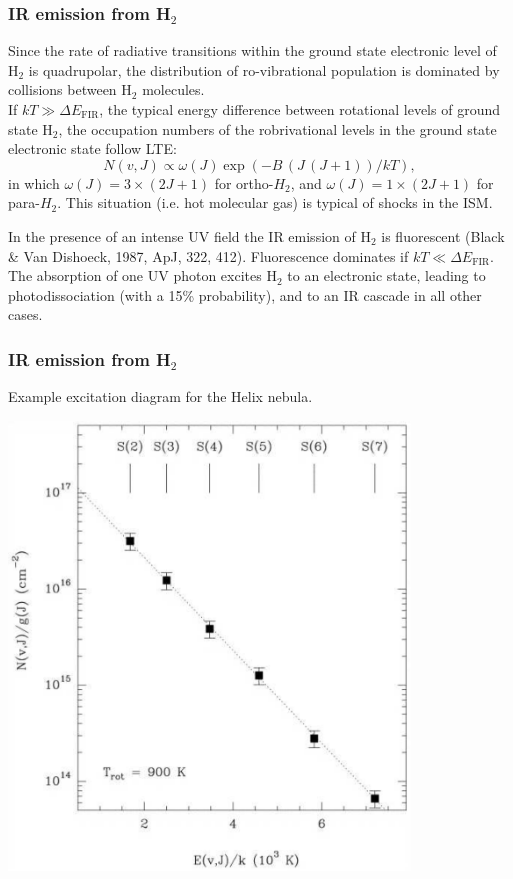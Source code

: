 \begin{frame}
\end{frame} \begin{frame}\frametitle{IR emission from  H$_2$}

Since the rate of radiative transitions within the ground state
electronic level of H$_2$ is quadrupolar, the distribution of
ro-vibrational population is dominated by collisions between H$_2$
molecules. \\

If $kT \gg \Delta E_\mathrm{FIR}$, the typical energy difference between
rotational levels of ground state H$_2$, the occupation numbers of the
robrivational levels in the ground state electronic state follow LTE:
\[ N(v,J) \propto \omega(J) \exp(-B\,(J\,(J+1))/kT), \]
in which $\omega(J) = 3 \times (2J+1) $ for ortho-$H_2$, and $\omega(J)
= 1 \times (2J+1) $ for para-$H_2$. This situation (i.e. hot molecular
gas) is typical of shocks in the ISM.

In the presence of an intense UV field the IR emission of H$_2$ is
fluorescent (Black \& Van Dishoeck, 1987, ApJ, 322, 412). Fluorescence
dominates if $kT \ll \Delta E_\mathrm{FIR}$. The absorption of one UV
photon excites H$_2$ to an electronic state, leading to
photodissociation (with a 15\% probability), and to an IR cascade in
all other cases.





\end{frame} \begin{frame}\frametitle{IR emission from H$_2$}

Example excitation diagram for the Helix nebula.

\begin{center}
\includegraphics[width=0.8\textwidth,height=!]{./B/helix_ltepop.pdf}
\end{center}

\end{frame} 

